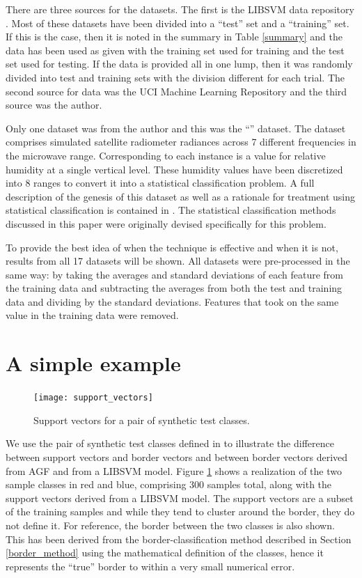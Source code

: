There are three sources for the datasets.
The first is the LIBSVM data repository \citep{Chang_Lin2011}.
Most of these datasets have been divided into a ``test'' set and a ``training'' set.
If this is the case, then it is noted in the summary in Table \ref{summary}
and the data has been used as given with the training set used for training
and the test set used for testing.
If the data is provided all in one lump, then it was randomly divided into 
test and training sets with the division different for each trial.
The second source for data was the UCI Machine Learning Repository
\citep{Lichman2013} and the third source was the author.

Only one dataset was from the author and this was the ``'' dataset.
The  dataset comprises simulated satellite radiometer radiances across 7 different frequencies in the microwave range.
Corresponding to each instance is a value for relative humidity at a single
vertical level.
These humidity values have been discretized into 8 ranges to convert it into a statistical classification problem.
A full description of the genesis of this dataset as well as a rationale for
treatment using statistical classification is contained in \citet{Mills2009}.
The statistical classification methods discussed in this paper were originally
devised specifically for this problem.

To provide the best idea of when the technique is effective and when it is
not, results from all 17 datasets will be shown. 
All datasets were pre-processed in the same way: by taking the averages and
standard deviations of each feature from the training data and subtracting
the averages from both the test and training data and dividing by the 
standard deviations.
Features that took on the same value in the training data were removed.


\section{A simple example}

\label{example}

\begin{figure}
\texttt{[image: support\_vectors]}
\caption{Support vectors for a pair of synthetic test classes.}\label{sample_sv}
\end{figure}

We use the pair of synthetic test classes defined in \citet{Mills2011} to 
illustrate the difference between support vectors and border vectors and 
between border vectors derived from AGF and from a LIBSVM model.
Figure \ref{sample_sv} shows a realization of the two sample classes 
in red and blue, comprising 300 samples total, along
with the support vectors derived from a LIBSVM model.
The support vectors are a subset of the training samples and while they
tend to cluster around the border, they do not define it.
For reference, the border between the two classes is also shown.
This has been derived from the border-classification method described in 
Section \ref{border_method} using the mathematical definition of the classes,
hence it represents the ``true'' border to within a very small numerical error.


